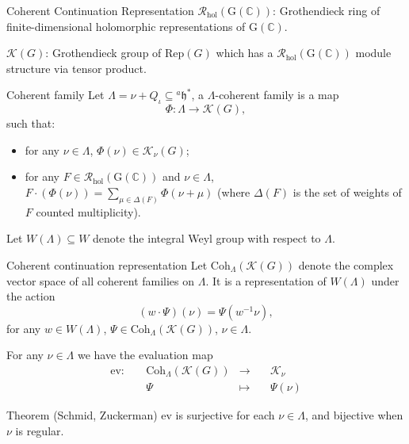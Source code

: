 \documentclass[fleqn,xcolor=dvipsnames]{beamer}
\newcommand{\BC}{{\mathbb {C}}}
\newcommand{\CK}{{\mathcal {K}}}
\newcommand{\CR}{{\mathcal {R}}}
\newcommand{\RG}{{\mathrm {G}}}
\newcommand{\fh}{\mathfrak{h}}
\newcommand{\Rep}{{\mathrm{Rep}}}
\newcommand{\defmap}[5]{
           \begin{equation*}
              \begin{aligned}
                   #1:\quad  & #2 &\longrightarrow &\quad #3 \\
                      \quad  & #4    &\longmapsto  &\quad #5
              \end{aligned}
           \end{equation*}
          }
\begin{document}
\begin{frame}{Coherent Continuation Representation}
  $\CR_{\mathrm{hol}}(\RG(\BC))$: Grothendieck ring of finite-dimensional holomorphic representations of $\RG(\BC)$.\par
  $\CK(G)$: Grothendieck group of $\Rep(G)$ which has a $\CR_{\mathrm{hol}}(\RG(\BC))$ module structure via tensor product.
  \begin{block}{Coherent family}
    Let $\Lambda = \nu + Q_{\iota} \subseteq {^{a}\fh}^*$, a $\Lambda$-coherent family is a map
   $$\Phi: \Lambda \to \CK(G),$$
   such that:
   \begin{itemize}
      \item for any $\nu \in \Lambda$, $\Phi(\nu) \in \CK_{\nu}(G)$;
      \item for any $F \in \CR_{\mathrm{hol}}(\RG(\BC))$ and $\nu \in \Lambda$, $F \cdot (\Phi(\nu)) = \sum_{\mu \in \Delta(F)} \Phi(\nu + \mu)$ (where $\Delta(F)$ is the set of weights of $F$ counted multiplicity).
   \end{itemize}
  \end{block}
\end{frame}






\begin{frame}
  Let $W(\Lambda) \subseteq W$ denote the integral Weyl group with respect to $\Lambda$.
  \begin{block}{Coherent continuation representation}
  Let $\mathrm{Coh}_{\Lambda}(\CK(G))$ denote the complex vector space of all coherent families on $\Lambda$. It is a representation of $W(\Lambda)$ under the action
  \[(w \cdot \Psi)(\nu) = \Psi(w^{-1}\nu),\]
  for any $w \in W(\Lambda)$, $\Psi \in \mathrm{Coh}_{\Lambda}(\CK(G))$, $\nu \in \Lambda$.
  \end{block}
    For any $\nu \in \Lambda$ we have the evaluation map \defmap{\mathrm{ev}}{\mathrm{Coh}_{\Lambda}(\CK(G))}{\CK_{\nu}}{\Psi}{\Psi(\nu)}
  \begin{block}{Theorem (Schmid, Zuckerman)}
    $\mathrm{ev}$ is surjective for each $\nu \in \Lambda$, and bijective when $\nu$ is regular.
  \end{block}

\end{frame}
\end{document}
